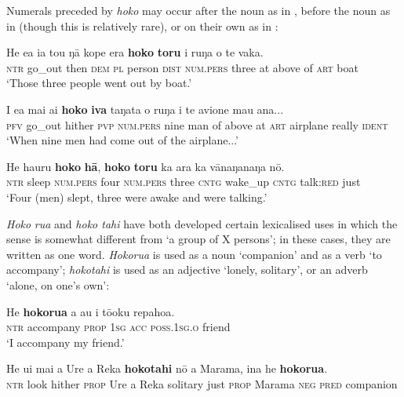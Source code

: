 Numerals preceded by \textit{hoko} may occur after the noun as in , before the noun as in  (though this is relatively rare), or on their own as in :

\ea\label{ex:4.30}
\gll He e{\ꞌ}a ia tou ŋā kope era \textbf{hoko} \textbf{toru} {\ꞌ}i ruŋa o te vaka. \\
\textsc{ntr} go\_out then \textsc{dem} \textsc{pl} person \textsc{dist} \textsc{num.pers} three at above of \textsc{art} boat \\

\glt 
‘Those three people went out by boat.’ \textstyleExampleref{[R309.102]} 
\z

\ea\label{ex:4.31}
\gll I e{\ꞌ}a mai ai \textbf{hoko} \textbf{iva} taŋata o ruŋa i te {\ꞌ}avione mau {\ꞌ}ana... \\
\textsc{pfv} go\_out hither \textsc{pvp} \textsc{num.pers} nine man of above at \textsc{art} airplane really \textsc{ident} \\

\glt 
‘When nine men had come out of the airplane...’ \textstyleExampleref{[R539-2.215]}
\z

\ea\label{ex:4.32}
\gll He ha{\ꞌ}uru \textbf{hoko} \textbf{hā}, \textbf{hoko} \textbf{toru} ka {\ꞌ}ara ka vānaŋanaŋa nō. \\
\textsc{ntr} sleep \textsc{num.pers} four \textsc{num.pers} three \textsc{cntg} wake\_up \textsc{cntg} talk:\textsc{red} just \\

\glt
‘Four (men) slept, three were awake and were talking.’ \textstyleExampleref{[MsE-050.005]}
\z

\textit{Hoko} \textit{rua} and \textit{hoko tahi} have both developed certain lexicalised uses in which the sense is somewhat different from ‘a group of X persons’; in these cases, they are written as one word. \textit{Hokorua} is used as a noun ‘companion’ and as a verb ‘to accompany’; \textit{hokotahi} is used as an adjective ‘lonely, solitary’, or an adverb ‘alone, on one’s own’:

\ea\label{ex:4.33}
\gll He \textbf{hokorua} a au i tō{\ꞌ}oku repahoa. \\
\textsc{ntr} accompany \textsc{prop} \textsc{1sg} \textsc{acc} \textsc{poss.1sg.o} friend \\

\glt 
‘I accompany my friend.’ \textstyleExampleref{[R208.138]} 
\z

\ea\label{ex:4.34}
\gll He u{\ꞌ}i mai a Ure {\ꞌ}a Reka \textbf{hokotahi} nō a Marama, {\ꞌ}ina he \textbf{hokorua}. \\
\textsc{ntr} look hither \textsc{prop} Ure a Reka solitary just \textsc{prop} Marama \textsc{neg} \textsc{pred} companion \\

